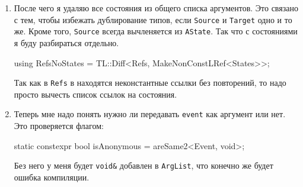 \documentclass{article}
\begin{document}
{\begin{enumerate}
\item После чего я удаляю все состояния из общего списка аргументов.
Это связано с тем, чтобы избежать дублирование типов, если \verb"Source" и \verb"Target" одно и то же.
Кроме того, \verb"Source" всегда вычленяется из \verb"AState".
Так что с состояниями я буду разбираться отдельно.
\begin{cppcode}[\nonumbers]
using RefsNoStates = TL::Diff<Refs, MakeNonConstLRef<States>>;
\end{cppcode}
Так как в \verb"Refs" в находятся неконстантные ссылки без повторений, то надо просто вычесть список ссылок на состояния.

\item  Теперь мне надо понять нужно ли передавать \verb"event" как аргумент или нет.
Это проверяется флагом:
\begin{cppcode}[\nonumbers]
static constexpr bool isAnonymous = areSame2<Event, void>;
\end{cppcode} 
Без него у меня будет \verb"void&" добавлен в \verb"ArgList", что конечно же будет ошибка компиляции.


\end{enumerate}}
\end{document}
